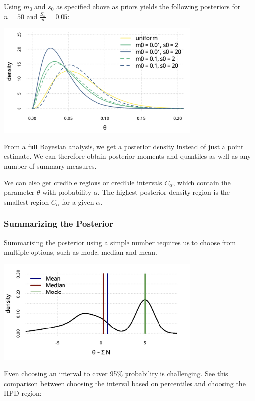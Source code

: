 Using $m_0$ and $s_0$ as specified above as priors yields the following posteriors for $n = 50$ and $\frac{S_n}{n} = 0.05$:

\begin{center}
	\includegraphics[width = 10cm]{betapost2.png}
\end{center}

From a full Bayesian analysis, we get a posterior density instead of just a point estimate. We can therefore obtain posterior moments and quantiles as well as any number of summary measures.

We can also get credible regions or credible intervals $C_\alpha$, which contain the parameter $\theta$ with probability $\alpha$. The highest posterior density region is the smallest region $C_\alpha$ for a given $\alpha$. 

\subsubsection{Summarizing the Posterior}

Summarizing the posterior using a simple number requires us to choose from multiple options, such as mode, median and mean.

\begin{center}
	\includegraphics[width = 10cm]{posteriorpoint.png}
\end{center}

Even choosing an interval to cover 95\% probability is challenging. See this comparison between choosing the interval based on percentiles and choosing the HPD region:

